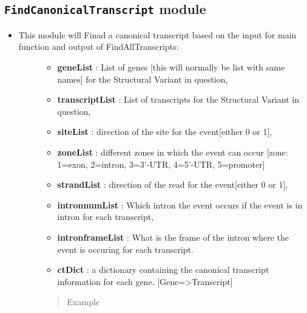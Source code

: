 \documentclass[letterpaper,10pt,english]{sphinxmanual}
\begin{document}
\subsection{\texttt{FindCanonicalTranscript} module}
\label{iAnnotateSV:findcanonicaltranscript-module}\begin{itemize}
\item {} \begin{description}
\item[{This module will Finad a canonical transcript based on the input for main function and output of FindAllTranscripts:}] \leavevmode\begin{itemize}
\item {} 
\textbf{geneList} : List of genes {[}this will normally be list with same names{]} for the Structural Variant in question,

\item {} 
\textbf{transcriptList} : List of transcripts for the Structural Variant in question,

\item {} 
\textbf{siteList} : direction of the site for the event{[}either 0 or 1{]},

\item {} 
\textbf{zoneList} : different zones in which the event can occur {[}zone: 1=exon, 2=intron, 3=3'-UTR, 4=5'-UTR, 5=promoter{]}

\item {} 
\textbf{strandList} : direction of the read for the event{[}either 0 or 1{]},

\item {} 
\textbf{intronnumList} : Which intron the event occurs if the event is in intron for each transcript,

\item {} 
\textbf{intronframeList} : What is the frame of the intron where the event is occuring for each transcript.

\item {} 
\textbf{ctDict} : a dictionary containing the canonical transcript information for each gene. {[}Gene=\textgreater{}Transcript{]}

\end{itemize}
\begin{quote}\begin{description}
\item[{Example}] \leavevmode
{}

\end{description}\end{quote}

\end{description}

\end{itemize}
\end{document}
